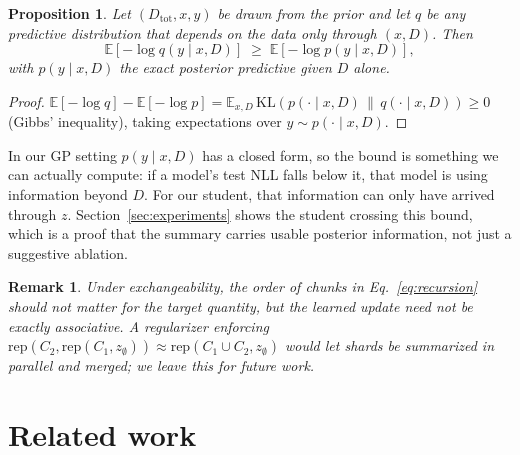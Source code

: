 \documentclass[11pt]{article}
\newcommand{\Dtot}{D_{\mathrm{tot}}}
\newcommand{\Dloc}{D}
\newcommand{\KL}[2]{\mathrm{KL}\!\left(#1 \,\middle\|\, #2\right)}
\newcommand{\rep}{\mathrm{rep}}
\newtheorem{proposition}{Proposition}
\newtheorem{remark}{Remark}
\begin{document}
\begin{proposition}
\label{prop:bound}
Let $(\Dtot, x, y)$ be drawn from the prior and let $q$ be any predictive
distribution that depends on the data only through $(x, \Dloc)$. Then
\[
  \mathbb{E}\left[-\log q(y \mid x, \Dloc)\right]
  \;\ge\;
  \mathbb{E}\left[-\log p(y \mid x, \Dloc)\right],
\]
with $p(y \mid x, \Dloc)$ the exact posterior predictive given $\Dloc$
alone.
\end{proposition}

\begin{proof}
$\mathbb{E}[-\log q] - \mathbb{E}[-\log p]
= \mathbb{E}_{x, \Dloc}\,\KL{p(\cdot \mid x, \Dloc)}{q(\cdot \mid x, \Dloc)}
\ge 0$ (Gibbs' inequality), taking expectations over $y \sim
p(\cdot \mid x, \Dloc)$.
\end{proof}

In our GP setting $p(y \mid x, \Dloc)$ has a closed form, so the bound is
something we can actually compute: if a model's test NLL falls below it,
that model is using information beyond $\Dloc$. For our student, that
information can only have arrived through $z$. Section~\ref{sec:experiments}
shows the student crossing this bound, which is a proof that the summary
carries usable posterior information, not just a suggestive ablation.

\begin{remark}
Under exchangeability, the order of chunks in Eq.~\eqref{eq:recursion}
should not matter for the target quantity, but the learned update need not
be exactly associative. A regularizer enforcing
$\rep(C_2, \rep(C_1, z_\emptyset)) \approx \rep(C_1 \cup C_2, z_\emptyset)$
would let shards be summarized in parallel and merged; we leave this for
future work.
\end{remark}

\section{Related work}
\label{sec:related}
\end{document}
